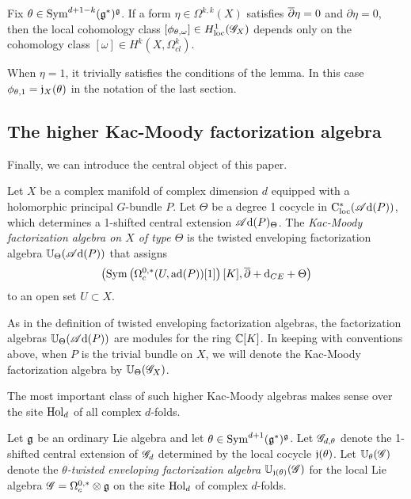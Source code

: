 \begin{lem}\label{lem: cocycle KM}
Fix $\theta \in {\rm Sym}^{d+1-k}(\mathfrak g^*)^\mathfrak g$.
If a form $\eta \in \Omega^{k,k}(X)$ satisfies $\overline{\partial} \eta = 0$ and $\partial \eta = 0$,
then the local cohomology class $[\phi_{\theta,\omega}] \in H^1_{\rm loc}(\mathscr G_X)$  depends only on the cohomology class $[\omega] \in H^{k}(X , \Omega^k_{cl})$.
\end{lem}

When $\eta = 1$, it trivially satisfies the conditions of the lemma. 
In this case $\phi_{\theta, 1} = \mathfrak j_X(\theta)$ in the notation of the last section. 


\subsection{The higher Kac-Moody factorization algebra}

Finally, we can introduce the central object of this paper.

\begin{dfn}
Let $X$ be a complex manifold of complex dimension $d$ equipped with a holomorphic principal $G$-bundle $P$.
Let $\Theta$ be a degree 1 cocycle in ${\rm C}_{\rm loc}^*(\mathscr A{\rm d}(P))$, 
which determines a 1-shifted central extension $\mathscr A{\rm d}(P)_\Theta$.
The {\em Kac-Moody factorization algebra on $X$ of type $\Theta$} is the twisted enveloping factorization algebra $\mathbb U_\Theta (\mathscr A{\rm d}(P))$ that assigns
\[
\left({\rm Sym}\left(\Omega^{0,*}_c(U, {\rm ad}(P))[1]\right) [K] , \overline{\partial} + {\rm d}_{CE} + \Theta\right) 
\]
to an open set $U \subset X$.
\end{dfn}

\begin{rmk} 
As in the definition of twisted enveloping factorization algebras, the factorization algebras $\mathbb U_\Theta(\mathscr A{\rm d}(P))$ are modules for the ring $\mathbb C[K]$. 
In keeping with conventions above, when $P$ is the trivial bundle on $X$, 
we will denote the Kac-Moody factorization algebra by $\mathbb U_\Theta(\mathscr G_X)$. 
\end{rmk}

The most important class of such higher Kac-Moody algebras makes sense over the site ${\rm Hol}_d$ of all complex $d$-folds.

\begin{dfn}
Let $\mathfrak g$ be an ordinary Lie algebra and let $\theta \in {\rm Sym}^{d+1}(\mathfrak g^*)^\mathfrak g$.  
Let $\mathscr G_{d,\theta}$ denote the 1-shifted central extension of $\mathscr G_d$ determined by the local cocycle $\mathfrak j(\theta)$.
Let $\mathbb U_\theta (\mathscr G)$ denote the {\em $\theta$-twisted enveloping factorization algebra} $\mathbb U_{\mathfrak j(\theta)} (\mathscr G)$ for the local Lie algebra $\mathscr G = \Omega^{0,*}_c \otimes \mathfrak g$ on the site ${\rm Hol}_d$ of complex $d$-folds.
\end{dfn}

